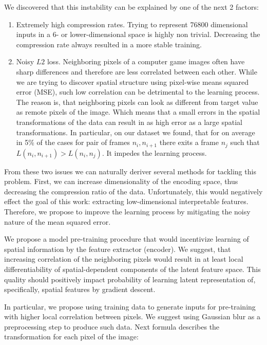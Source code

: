 We discovered that this instability can be explained by one of the next 2 factors:
\begin{enumerate}
  \item Extremely high compression rates. Trying to represent 76800 dimensional inputs in a 6- or lower-dimensional space is highly non trivial. Decreasing the compression rate always resulted in a more stable training.
  \item Noisy $L2$ loss. Neighboring pixels of a computer game images often have sharp differences and therefore are less correlated between each other.
  While we are trying to discover spatial structure using pixel-wise means squared error (MSE), such low correlation can be detrimental to the learning process.
  The reason is, that neighboring pixels can look as different from target value as remote pixels of the image.
  Which means that a small errors in the spatial transformations of the data can result in as high error as a large spatial transformations.
  In particular, on our dataset we found, that for on average in 5\% of the cases for pair of frames $n_i, n_{i+1}$ there exits a frame $n_j$ such that $L(n_i, n_{i+1}) > L(n_i, n_j)$.
  It impedes the learning process.
\end{enumerate}

From these two issues we can naturally deriver several methods for tackling this problem.
First, we can increase dimensionality of the encoding space, thus decreasing the compression ratio of the data.
Unfortunately, this would negatively effect the goal of this work: extracting low-dimensional interpretable features.
Therefore, we propose to improve the learning process by mitigating the noisy nature of the mean squared error.

We propose a model pre-training procedure that would incentivize learning of spatial information by the feature extractor (encoder).
We suggest, that increasing correlation of the neighboring pixels would result in at least local differentiability of spatial-dependent components of the latent feature space.
This quality should positively impact probability of learning latent representation of, specifically, spatial features by gradient descent.

In particular, we propose using training data to generate inputs for pre-training with higher local correlation between pixels.
We suggest using Gaussian blur as a preprocessing step to produce such data.
Next formula describes the transformation for each pixel of the image:

